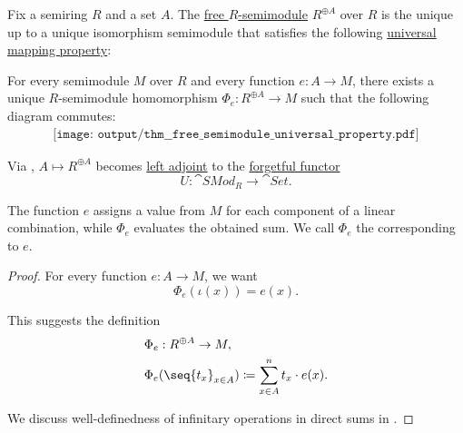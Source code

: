 \begin{proposition}\label{thm:free_semimodule_universal_property}
  Fix a semiring \( R \) and a set \( A \). The \hyperref[def:free_semimodule]{free \( R \)-semimodule} \( R^{\oplus A} \) over \( R \) is the unique up to a unique isomorphism semimodule that satisfies the following \hyperref[rem:universal_mapping_property]{universal mapping property}:
  \begin{displayquote}
    For every semimodule \( M \) over \( R \) and every function \( e: A \to M \), there exists a unique \( R \)-semimodule homomorphism \( \Phi_e: R^{\oplus A} \to M \) such that the following diagram commutes:
    \begin{equation}\label{eq:thm:free_semimodule_universal_property/diagram}
      \begin{aligned}
        \texttt{[image: output/thm\_\_free\_semimodule\_universal\_property.pdf]}
      \end{aligned}
    \end{equation}
  \end{displayquote}

  Via , \( A \mapsto R^{\oplus A} \) becomes \hyperref[def:category_adjunction]{left adjoint} to the \hyperref[def:concrete_category]{forgetful functor}
  \begin{equation*}
    U: \cat{SMod}_R \to \cat{Set}.
  \end{equation*}

  The function \( e \) assigns a value from \( M \) for each component of a linear combination, while \( \Phi_e \) evaluates the obtained sum. We call \( \Phi_e \) the  corresponding to \( e \).
\end{proposition}
\begin{proof}
  For every function \( e: A \to M \), we want
  \begin{equation*}
    \Phi_e(\iota(x)) = e(x).
  \end{equation*}

  This suggests the definition
  \begin{equation*}
    \begin{aligned}
      &\Phi_e: R^{\oplus A} \to M, \\
      &\Phi_e(\seq{ t_x }_{x \in A}) \coloneqq \sum_{x \in A}^n t_x \cdot e(x).
    \end{aligned}
  \end{equation*}

  We discuss well-definedness of infinitary operations in direct sums in .
\end{proof}


